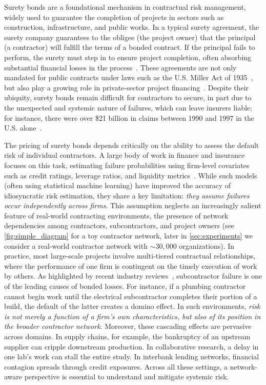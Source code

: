 \documentclass[mnsc,nonblindrev]{informs3}
\begin{document}
Surety bonds are a foundational mechanism in contractual risk management, widely used to guarantee the completion of projects in sectors such as construction, infrastructure, and public works. In a typical surety agreement, the surety company guarantees to the obligee (the project owner) that the principal (a contractor) will fulfill the terms of a bonded contract. If the principal fails to perform, the surety must step in to ensure project completion, often absorbing substantial financial losses in the process~\citep{russell1990surety}. These agreements are not only mandated for public contracts under laws such as the U.S. Miller Act of 1935~\citep{uscode40_3131}, but also play a growing role in private-sector project financing~\citep{wambach2011surety}. Despite their ubiquity, surety bonds remain difficult for contractors to secure, in part due to the unexpected and systemic nature of failures, which can leave insurers liable; for instance, there were over \$21 billion in claims between 1990 and 1997 in the U.S. alone~\citep{wambach2011surety}.

The pricing of surety bonds depends critically on the ability to assess the default risk of individual contractors. A large body of work in finance and insurance focuses on this task, estimating failure probabilities using firm-level covariates such as credit ratings, leverage ratios, and liquidity metrics~\citep{kim2019default}. While such models (often using statistical machine learning) have improved the accuracy of idiosyncratic risk estimation, they share a key limitation: {\em they assume failures occur independently across firms}. This assumption neglects an increasingly salient feature of real-world contracting environments, the presence of network dependencies among contractors, subcontractors, and project owners (see \cref{fig:simple_diagram} for a toy contractor network, later in \cref{sec:experiments} we consider a real-world contractor network with $\sim30,000$ organizations).  
In practice, most large-scale projects involve multi-tiered contractual relationships, where the performance of one firm is contingent on the timely execution of work by others. As highlighted by recent industry reviews~\citep{assuredpartners2024surety, bci2021supplychain}, subcontractor failure is one of the leading causes of bonded losses. For instance, if a plumbing contractor cannot begin work until the electrical subcontractor completes their portion of a build, the default of the latter creates a domino effect. In such environments, {\em risk is not merely a function of a firm’s own characteristics, but also of its position in the broader contractor network}.  Moreover, these cascading effects are pervasive across domains. In supply chains, for example, the bankruptcy of an upstream supplier can cripple downstream production. In collaborative research, a delay in one lab’s work can stall the entire study. In interbank lending networks, financial contagion spreads through credit exposures. Across all these settings, a network-aware perspective is essential to understand and mitigate systemic risk.
\end{document}
